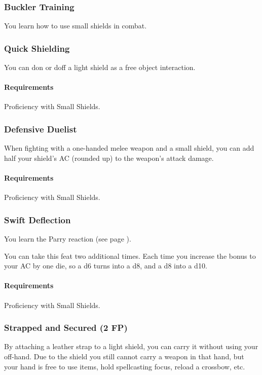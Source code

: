 \subsubsection{Buckler Training} \label{feat::bucklertraining}
    You learn how to use small shields in combat.
\subsubsection{Quick Shielding} \label{feat::quickshielding}
    You can don or doff a light shield as a free object interaction.
    \paragraph{Requirements} Proficiency with Small Shields.
\subsubsection{Defensive Duelist} \label{feat::defensiveduelist}
    When fighting with a one-handed melee weapon and a small shield, you can add half your shield's AC (rounded up) to the weapon's attack damage.
    \paragraph{Requirements} Proficiency with Small Shields.
\subsubsection{Swift Deflection} \label{feat::swiftdeflection}
    You learn the Parry reaction (see page \pageref{act::parry}).

    You can take this feat two additional times.
    Each time you increase the bonus to your AC by one die, so a d6 turns into a d8, and a d8 into a d10.
    \paragraph{Requirements} Proficiency with Small Shields.
\subsubsection{Strapped and Secured (2 FP)} \label{feat::strappedandsecured}
    By attaching a leather strap to a light shield, you can carry it without using your off-hand.
    Due to the shield you still cannot carry a weapon in that hand, but your hand is free to use items, hold spellcasting focus, reload a crossbow, etc.

